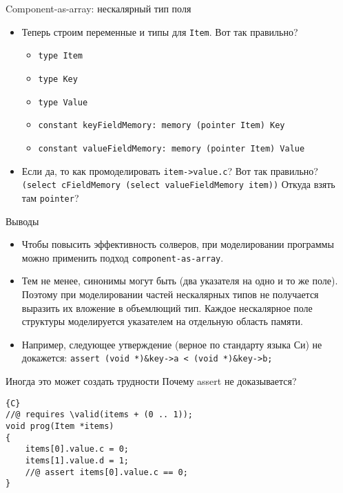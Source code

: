 \documentclass[hyperref={unicode=true}]{beamer}
\begin{document}
    \begin{frame}{Component-as-array: нескалярный тип поля}
    \begin{itemize}
    \item
    Теперь строим переменные и типы для \texttt{Item}. Вот так правильно?
        \begin{itemize}
        \item \texttt{type Item}
        \item \texttt{type Key}
        \item \texttt{type Value}
        \item \texttt{constant keyFieldMemory: memory (pointer Item) Key}
        \item \texttt{constant valueFieldMemory: memory (pointer Item) Value}
        \end{itemize}
    \item
    Если да, то как промоделировать \texttt{item->value.c}? Вот так
    правильно?
    \texttt{(select cFieldMemory (select valueFieldMemory item))}
    Откуда взять там \texttt{pointer}?
    \end{itemize}
    \end{frame}

    \begin{frame}{Выводы}
    \begin{itemize}
    \item
    Чтобы повысить эффективность солверов, при моделировании программы
    можно применить подход \texttt{component-as-array}.
    \item
    Тем не менее, синонимы могут быть (два указателя на одно и то же поле).
    Поэтому при моделировании частей нескалярных типов не получается
    выразить их вложение в объемлющий тип. Каждое нескалярное поле структуры
    моделируется указателем на отдельную область памяти.
    \item
    Например, следующее утверждение (верное по стандарту языка Си)
    не докажется: \texttt{assert (void *)\&key->a < (void *)\&key->b;}
    \end{itemize}
    \end{frame}

    \begin{frame}[fragile]{Иногда это может создать трудности}
    Почему assert не доказывается?
    \begin{lstlisting}{C}
//@ requires \valid(items + (0 .. 1));
void prog(Item *items)
{
    items[0].value.c = 0;
    items[1].value.d = 1;
    //@ assert items[0].value.c == 0;
}
    \end{lstlisting}
    \end{frame}
\end{document}

